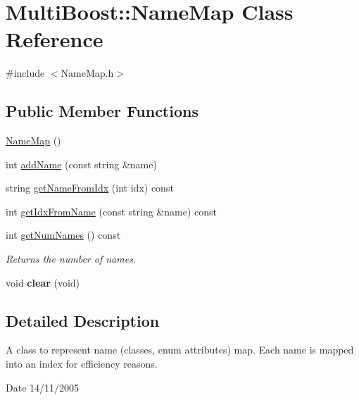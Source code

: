 \hypertarget{classMultiBoost_1_1NameMap}{\section{Multi\-Boost\-:\-:Name\-Map Class Reference}
\label{classMultiBoost_1_1NameMap}
}


{\ttfamily \#include $<$Name\-Map.\-h$>$}

\subsection*{Public Member Functions}
\begin{DoxyCompactItemize}
\item 
\hyperlink{classMultiBoost_1_1NameMap_a8d55d16fd3cde025aca9647271861695}{Name\-Map} ()
\item 
int \hyperlink{classMultiBoost_1_1NameMap_a2f068a22f1535b42a1580e9663c82b90}{add\-Name} (const string \&name)
\item 
string \hyperlink{classMultiBoost_1_1NameMap_a31b9038a4031c459fd59fc6e39e402d5}{get\-Name\-From\-Idx} (int idx) const 
\item 
int \hyperlink{classMultiBoost_1_1NameMap_a949a9878b36ec8949bc845abaa486331}{get\-Idx\-From\-Name} (const string \&name) const 
\item 
\hypertarget{classMultiBoost_1_1NameMap_a73571dd54b6f7f292d225b56ad63e8a9}{int \hyperlink{classMultiBoost_1_1NameMap_a73571dd54b6f7f292d225b56ad63e8a9}{get\-Num\-Names} () const }\label{classMultiBoost_1_1NameMap_a73571dd54b6f7f292d225b56ad63e8a9}

\begin{DoxyCompactList}\small\item\em Returns the number of names. \end{DoxyCompactList}\item 
\hypertarget{classMultiBoost_1_1NameMap_a5569328b823afa71ea9eb8231622dd2b}{void {\bfseries clear} (void)}\label{classMultiBoost_1_1NameMap_a5569328b823afa71ea9eb8231622dd2b}

\end{DoxyCompactItemize}


\subsection{Detailed Description}
A class to represent name (classes, enum attributes) map. Each name is mapped into an index for efficiency reasons. \begin{DoxyDate}{Date}
14/11/2005 
\end{DoxyDate}



